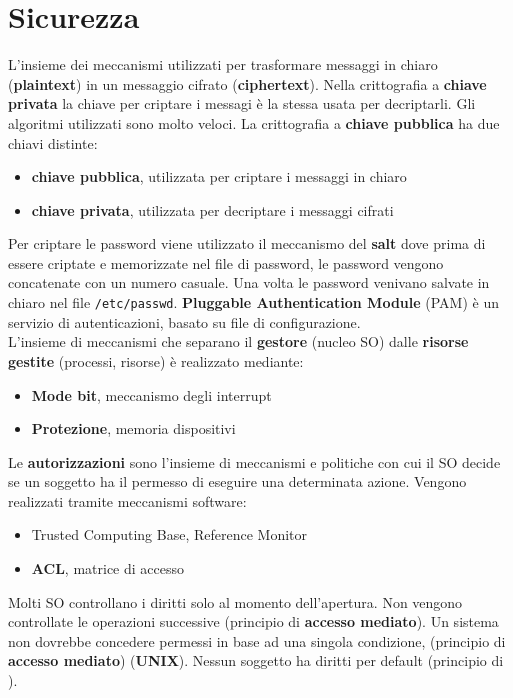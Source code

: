 \documentclass{article}
\begin{document}
\section{Sicurezza}

L'insieme dei meccanismi utilizzati per trasformare messaggi in chiaro (\textbf{plaintext}) in un messaggio cifrato (\textbf{ciphertext}). Nella crittografia a \textbf{chiave privata} la chiave per criptare i messagi è la stessa usata per decriptarli. Gli algoritmi utilizzati sono molto veloci.
La crittografia a \textbf{chiave pubblica} ha due chiavi distinte:
\begin{itemize}
  \item \textbf{chiave pubblica}, utilizzata per criptare i messaggi in chiaro
  \item \textbf{chiave privata}, utilizzata per decriptare i messaggi cifrati
\end{itemize}
Per criptare le password viene utilizzato il meccanismo del \textbf{salt} dove prima di essere criptate e memorizzate nel file di password, le password vengono concatenate con un numero casuale. Una volta le password venivano salvate in chiaro nel file \texttt{/etc/passwd}. 
\textbf{Pluggable Authentication Module} (PAM) è un servizio di autenticazioni, basato su file di configurazione.\\
L'insieme di meccanismi che separano il \textbf{gestore} (nucleo SO) dalle \textbf{risorse gestite} (processi, risorse) è realizzato mediante:
\begin{itemize}
  \item \textbf{Mode bit}, meccanismo degli interrupt
  \item \textbf{Protezione}, memoria dispositivi
\end{itemize}
Le \textbf{autorizzazioni} sono l'insieme di meccanismi e politiche con cui il SO decide se un soggetto ha il permesso di eseguire una determinata azione. Vengono realizzati tramite meccanismi software:
\begin{itemize}
  \item Trusted Computing Base, Reference Monitor
  \item \textbf{ACL}, matrice di accesso
\end{itemize}
Molti SO controllano i diritti solo al momento dell'apertura. Non vengono controllate le operazioni successive (principio di \textbf{accesso mediato}). Un sistema non dovrebbe concedere permessi in base ad una singola condizione, (principio di \textbf{accesso mediato})  (\textbf{UNIX}). Nessun soggetto ha diritti per default (principio di ).\\
\end{document}
